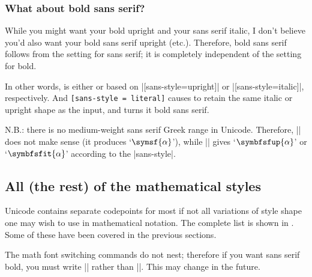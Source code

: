 \subsubsection{What about bold sans serif?}

While you might want your bold upright and your sans serif italic, I don't believe you'd also want your bold sans serif upright (etc.).
Therefore, bold sans serif follows from the setting for sans serif; it is completely independent of the setting for bold.

In other words,  is either  or  based on |[sans-style=upright]| or |[sans-style=italic]|, respectively. And \texttt{[sans-style = literal]} causes  to retain the same italic or upright shape as the input, and turns it bold sans serif.

N.B.: there is no medium-weight sans serif Greek range in Unicode.
Therefore, |\symsf{\alpha}| does not make sense (it produces `$\symsf{\alpha}$'), while |\symbfsf{\alpha}| gives `$\symbfsfup{\alpha}$' or `$\symbfsfit{\alpha}$' according to the |sans-style|.

\subsection{All (the rest) of the mathematical styles}

Unicode contains separate codepoints for most if not all variations of style
shape one may wish to use in mathematical notation. The complete list is shown
in . Some of these have been covered in the previous sections.

The math font switching commands do not nest; therefore if you want
sans serif bold, you must write || rather than ||.
This may change in the future.

